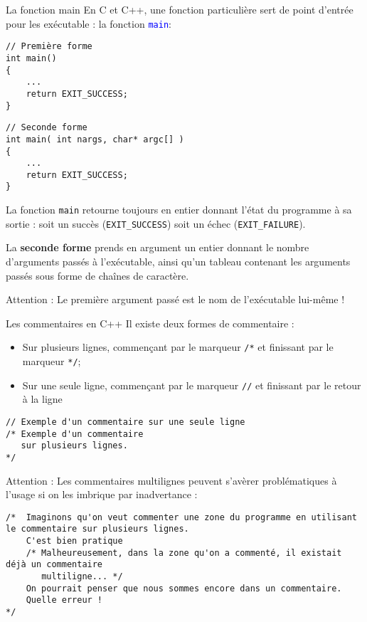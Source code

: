 \documentclass[compress,10pt,aspectratio=169]{beamer}
\begin{document}
\begin{frame}[fragile]{La fonction main}
    \scriptsize
    En C et C++, une fonction particulière sert de point d'entrée pour les exécutable : la fonction \texttt{\textcolor{blue}{main}}:

\begin{minipage}{0.49\textwidth}
\begin{verbatim}
// Première forme 
int main()
{
    ...
    return EXIT_SUCCESS;
}
\end{verbatim}
    \end{minipage}
    \begin{minipage}{0.49\textwidth}
\begin{verbatim}
// Seconde forme 
int main( int nargs, char* argc[] )
{
    ...
    return EXIT_SUCCESS;
}
\end{verbatim}
  \end{minipage}

La fonction \texttt{main} retourne toujours en entier donnant l'état du programme à sa sortie : soit un succès (\texttt{EXIT\_SUCCESS}) soit un échec (\texttt{EXIT\_FAILURE}).

La \textbf{seconde forme} prends en argument un entier donnant le nombre d'arguments passés à l'exécutable, ainsi qu'un tableau contenant
les arguments passés sous forme de chaînes de caractère.

\alert{Attention} : Le première argument passé est le nom de l'exécutable lui-même !
\end{frame}

\begin{frame}[fragile]{Les commentaires en C++}
    \scriptsize
    Il existe deux formes de commentaire :
    \begin{itemize}
        \item Sur plusieurs lignes, commençant par le marqueur \texttt{/*} et finissant par le marqueur \texttt{*/};
        \item Sur une seule ligne, commençant par le marqueur \texttt{//} et finissant par le retour à la ligne
    \end{itemize}

\begin{verbatim}
// Exemple d'un commentaire sur une seule ligne
/* Exemple d'un commentaire
   sur plusieurs lignes.
*/
\end{verbatim}

\alert{Attention} : Les commentaires multilignes peuvent s'avèrer problématiques à l'usage si on les imbrique par inadvertance :

\begin{verbatim}
/*  Imaginons qu'on veut commenter une zone du programme en utilisant le commentaire sur plusieurs lignes.
    C'est bien pratique 
    /* Malheureusement, dans la zone qu'on a commenté, il existait déjà un commentaire
       multiligne... */
    On pourrait penser que nous sommes encore dans un commentaire.
    Quelle erreur !
*/
\end{verbatim}
\end{frame}
\end{document}
